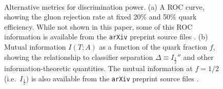 \documentclass[11pt,letterpaper]{article}
\begin{document}
\begin{figure}
\centering
{}
$\qquad$
$\qquad$
\caption{Alternative metrics for discrimination power.  (a) A ROC curve, showing the gluon rejection rate at fixed 20\% and 50\% quark efficiency.  While not shown in this paper, some of this ROC information is available from the \texttt{arXiv} preprint source files \cite{ArXivSource}.  (b) Mutual information $I(T;A)$ as a function of the quark fraction $f$, showing the relationship to classifier separation $\Delta \equiv I_{\frac{1}{2}}'' $ and other information-theoretic quantities.  The mutual information at $f = 1/2$ (i.e.~$I_{\frac{1}{2}}$) is also available from the \texttt{arXiv} preprint source files \cite{ArXivSource}.}
\end{figure}
\end{document}
